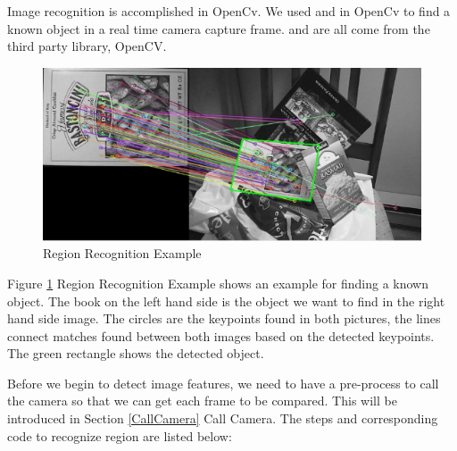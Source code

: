 \par Image recognition is accomplished in OpenCv. We used  and  in OpenCv to find a known object in a real time camera capture frame.  and  are all come from the third party library, OpenCV. 
\begin{figure}[htb]
\centering
\includegraphics[width=1\textwidth]{section04/assets/RegionRecognition.png}
\caption[Region Recognition Example]{\label{RegionRecognitionExample}Region Recognition Example}
\end{figure}
\par Figure \ref{RegionRecognitionExample} Region Recognition Example shows an example for finding a known object. The book on the left hand side is the object we want to find in the right hand side image. The circles are the keypoints found in both pictures, the lines connect matches found between both images based on the detected keypoints. The green rectangle shows the detected object.
\par Before we begin to detect image features, we need to have a pre-process to call the camera so that we can get each frame to be compared. This will be introduced in Section \ref{CallCamera} Call Camera. The steps and corresponding code to recognize region are listed below:
